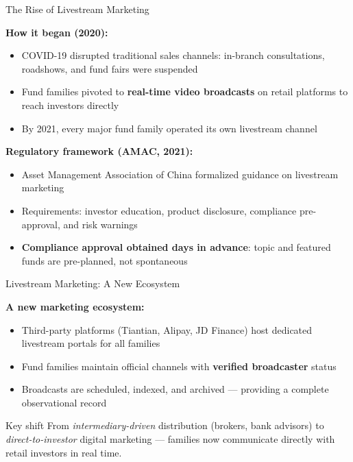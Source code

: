 \documentclass[11pt, aspectratio=169]{beamer}
\newcommand{\hl}[1]{\textcolor{myblue}{\textbf{#1}}}
\begin{document}
\begin{frame}{The Rise of Livestream Marketing}

\textbf{How it began (2020):}
\begin{itemize}
  \item COVID-19 disrupted traditional sales channels:
  in-branch consultations, roadshows, and fund fairs were suspended
  \item Fund families pivoted to \hl{real-time video broadcasts} on
  retail platforms to reach investors directly
  \item By 2021, every major fund family operated its own livestream channel
\end{itemize}

\vspace{0.35cm}
\textbf{Regulatory framework (AMAC, 2021):}
\begin{itemize}
  \item Asset Management Association of China formalized
  guidance on livestream marketing
  \item Requirements: investor education, product disclosure,
  compliance pre-approval, and risk warnings
  \item \hl{Compliance approval obtained days in advance}:
  topic and featured funds are pre-planned, not spontaneous
\end{itemize}

\end{frame}


\begin{frame}{Livestream Marketing: A New Ecosystem}

\textbf{A new marketing ecosystem:}
\begin{itemize}
  \item Third-party platforms (Tiantian, Alipay, JD Finance)
  host dedicated livestream portals for all families
  \item Fund families maintain official channels with
  \hl{verified broadcaster} status
  \item Broadcasts are scheduled, indexed, and archived ---
  providing a complete observational record
\end{itemize}

\vspace{0.4cm}
\begin{alertblock}{Key shift}
  From \textit{intermediary-driven} distribution (brokers, bank advisors)
  to \textit{direct-to-investor} digital marketing --- families now
  communicate directly with retail investors in real time.
\end{alertblock}

\end{frame}
\end{document}
